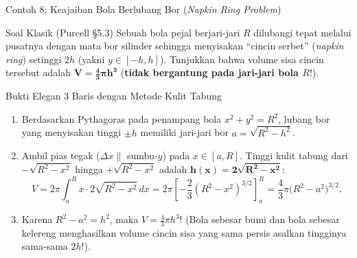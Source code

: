 \documentclass[aspectratio=43,10pt]{beamer}
\begin{document}
\begin{frame}{Contoh 8: Keajaiban Bola Berlubang Bor (\textit{Napkin Ring Problem})}
    \begin{exampleblock}{Soal Klasik (Purcell \S5.3)}
        \scriptsize
        Sebuah bola pejal berjari-jari $R$ dilubangi tepat melalui pusatnya dengan mata bor silinder sehingga menyisakan ``cincin serbet'' (\textit{napkin ring}) setinggi $2h$ (yakni $y \in [-h, h]$). Tunjukkan bahwa volume sisa cincin tersebut adalah $\mathbf{V = \frac{4}{3}\pi h^3}$ (\textbf{tidak bergantung pada jari-jari bola $R$}!).
    \end{exampleblock}

    \begin{block}{Bukti Elegan 3 Baris dengan Metode Kulit Tabung}
        \scriptsize\abovedisplayskip=2pt\belowdisplayskip=2pt
        \begin{enumerate}\itemsep=2pt
            \item Berdasarkan Pythagoras pada penampang bola $x^2 + y^2 = R^2$, lubang bor yang menyisakan tinggi $\pm h$ memiliki jari-jari bor $a = \sqrt{R^2 - h^2}$.
            \item Ambil pias tegak ($\Delta x \parallel$ sumbu-$y$) pada $x \in [a, R]$. Tinggi kulit tabung dari $-\sqrt{R^2 - x^2}$ hingga $+\sqrt{R^2 - x^2}$ adalah $\mathbf{h(x) = 2\sqrt{R^2 - x^2}}$:
            $$V = 2\pi\int_{a}^{R} x\cdot 2\sqrt{R^2 - x^2}\,dx = 2\pi\left[-\frac{2}{3}(R^2 - x^2)^{3/2}\right]_{a}^{R} = \frac{4}{3}\pi\big(R^2 - a^2\big)^{3/2}.$$
            \item Karena $R^2 - a^2 = h^2$, maka $\boxed{V = \frac{4}{3}\pi h^3}$! (Bola sebesar bumi dan bola sebesar kelereng menghasilkan volume cincin sisa yang sama persis asalkan tingginya sama-sama $2h$!).
        \end{enumerate}
    \end{block}
\end{frame}
\end{document}
